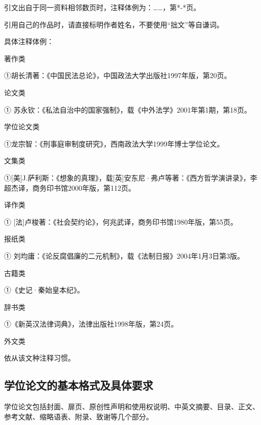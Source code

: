 \documentclass{hnuthesis}%
\begin{document}
\begin{asparaenum}
引文出自于同一资料相邻数页时，注释体例为：……，第*-*页。

引用自己的作品时，请直接标明作者姓名，不要使用“拙文”等自谦词。

具体注释体例：

著作类

①胡长清著：《中国民法总论》，中国政法大学出版社1997年版，第20页。

论文类

① 苏永钦：《私法自治中的国家强制》，载《中外法学》2001年第1期，第18页。

学位论文类

①龙宗智：《刑事庭审制度研究》，西南政法大学1999年博士学位论文。

文集类

①[美]J.萨利斯：《想象的真理》，载[英]安东尼·弗卢等著：《西方哲学演讲录》，李超杰译，商务印书馆2000年版，第112页。

译作类

① [法]卢梭著：《社会契约论》，何兆武译，商务印书馆1980年版，第55页。

报纸类

① 刘均庸：《论反腐倡廉的二元机制》，载《法制日报》2004年1月3日第3版。

古籍类

①《史记·秦始皇本纪》。

辞书类

①《新英汉法律词典》，法律出版社1998年版，第24页。

外文类

依从该文种注释习惯。
\end{asparaenum}


\subsection{学位论文的基本格式及具体要求}

学位论文包括封面、扉页、原创性声明和使用权说明、中英文摘要、目录、正文、参考文献、缩略语表、附录、致谢等几个部分。
\end{document}
